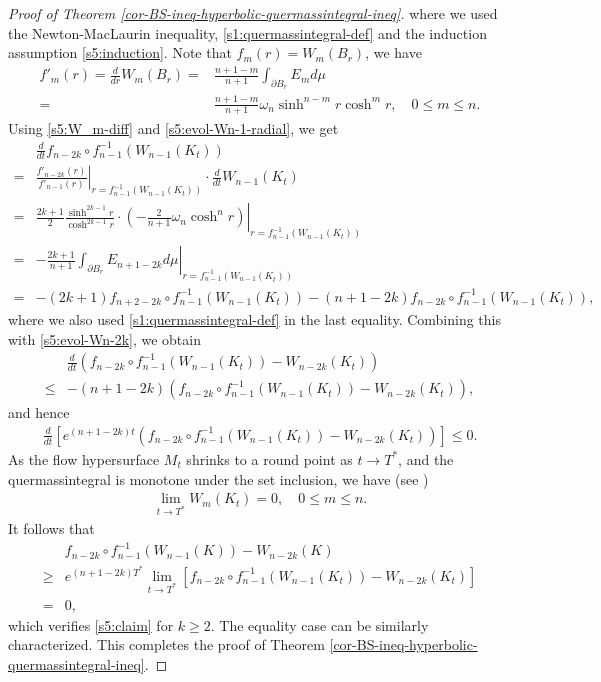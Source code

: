 \documentclass[11pt,reqno]{amsart}
\theoremstyle{definition}
\theoremstyle{remark}
\numberwithin{equation}{section}
\renewcommand{\(}{\left(}
\renewcommand{\)}{\right)}
\renewcommand{\~}{\tilde}
\renewcommand{\-}{\overline}
\newcommand{\ra}{\rightarrow}
\begin{document}
\begin{proof}[Proof of Theorem \ref{cor-BS-ineq-hyperbolic-quermassintegral-ineq}]
    where we used the Newton-MacLaurin inequality, \eqref{s1:quermassintegral-def} and the induction assumption \eqref{s5:induction}. Note that $f_m(r)=W_m(B_r)$, we have
    \begin{align}\label{s5:W_m-diff}
    f'_m(r)=\frac{d}{dr}W_m(B_r)=&\frac{n+1-m}{n+1}\int_{\partial B_r} E_m d\mu \nonumber\\
           =&\frac{n+1-m}{n+1}\omega_n \sinh^{n-m}r \cosh^{m}r, \quad 0\leq m\leq n. 
    \end{align}
    Using \eqref{s5:W_m-diff} and \eqref{s5:evol-Wn-1-radial}, we get
    \begin{align*}
    &\frac{d}{dt}f_{n-2k}\circ f_{n-1}^{-1}(W_{n-1}(K_t))\\=&\left.\frac{f'_{n-2k}(r)}{f'_{n-1}(r)}\right|_{r=f_{n-1}^{-1}(W_{n-1}(K_t))}\cdot \frac{d}{dt}W_{n-1}(K_t)\\
    =&\frac{2k+1}{2}\left.\frac{\sinh^{2k-1}r}{\cosh^{2k-1}r} \cdot  \(-\frac{2}{n+1}\omega_n \cosh^{n} r\)\right|_{r=f_{n-1}^{-1}(W_{n-1}(K_t))} \\
    =&-\left.\frac{2k+1}{n+1}\int_{\partial B_r}E_{n+1-2k}d\mu \right|_{r=f_{n-1}^{-1}(W_{n-1}(K_t))}\\
    =&-(2k+1) f_{n+2-2k}\circ f_{n-1}^{-1}(W_{n-1}(K_t))-(n+1-2k) f_{n-2k}\circ  f_{n-1}^{-1}(W_{n-1}(K_t)),
    \end{align*}
    where we also used \eqref{s1:quermassintegral-def} in the last equality. Combining this with \eqref{s5:evol-Wn-2k}, we obtain
    \begin{align*}
          &\frac{d}{dt}\(f_{n-2k}\circ f_{n-1}^{-1}(W_{n-1}(K_t))-W_{n-2k}(K_t)\) \\
    \leq  &-(n+1-2k)\(f_{n-2k}\circ f_{n-1}^{-1}(W_{n-1}(K_t))-W_{n-2k}(K_t)\),
    \end{align*}
    and hence 
    \begin{align*}
    \frac{d}{dt} \left[e^{(n+1-2k)t}\(f_{n-2k}\circ f_{n-1}^{-1}(W_{n-1}(K_t))-W_{n-2k}(K_t)\)\right]\leq 0.
    \end{align*}
    As the flow hypersurface $M_t$ shrinks to a round point as $t\ra T^{\ast}$, and the quermassintegral is monotone under the set inclusion, we have (see \cite[Lemma 3.3]{AHL2020})
    \begin{align*}
    \lim_{t\ra T^\ast}W_{m}(K_t)=0,\quad 0\leq m\leq n.
    \end{align*}
    It follows that
    \begin{align*}
         &f_{n-2k}\circ f_{n-1}^{-1}(W_{n-1}(K))-W_{n-2k}(K) \\
    \geq &e^{(n+1-2k)T^\ast}\lim_{t\ra T^\ast}\left[f_{n-2k}\circ f_{n-1}^{-1}(W_{n-1}(K_t))-W_{n-2k}(K_t)\right]\\
    =&0,
    \end{align*} 
    which verifies \eqref{s5:claim} for $k\geq 2$. The equality case can be similarly characterized. This completes the proof of Theorem \ref{cor-BS-ineq-hyperbolic-quermassintegral-ineq}.   
\end{proof}
\end{document}
